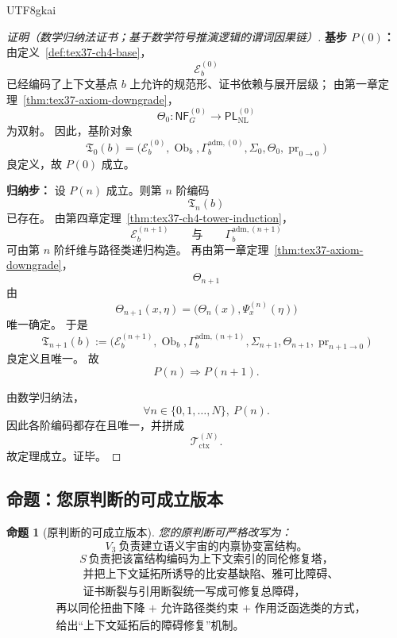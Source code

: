 \documentclass[12pt]{article}
\newtheorem{proposition}{命题}[section]
\begin{document}
\begin{CJK*}{UTF8}{gkai}
\begin{proof}[证明（数学归纳法证书；基于数学符号推演逻辑的谓词因果链）]
\textbf{基步 $P(0)$：}
由定义~\ref{def:tex37-ch4-base}，
\[
  \mathcal E_b^{(0)}
\]
已经编码了上下文基点 $b$ 上允许的规范形、证书依赖与展开层级；
由第一章定理~\ref{thm:tex37-axiom-downgrade}，
\[
  \Theta_0:\mathsf{NF}_G^{(0)}\to \mathsf{PL}_{\mathrm{NL}}^{(0)}
\]
为双射。
因此，基阶对象
\[
  \mathfrak T_0(b)
  =
  \bigl(
    \mathcal E_b^{(0)},
    \operatorname{Ob}_b,
    \Gamma_b^{\mathrm{adm},(0)},
    \Sigma_0,
    \Theta_0,
    \operatorname{pr}_{0\to 0}
  \bigr)
\]
良定义，故 $P(0)$ 成立。

\textbf{归纳步：}
设 $P(n)$ 成立。则第 $n$ 阶编码
\[
  \mathfrak T_n(b)
\]
已存在。
由第四章定理~\ref{thm:tex37-ch4-tower-induction}，
\[
  \mathcal E_b^{(n+1)}
  \qquad\text{与}\qquad
  \Gamma_b^{\mathrm{adm},(n+1)}
\]
可由第 $n$ 阶纤维与路径类递归构造。
再由第一章定理~\ref{thm:tex37-axiom-downgrade}，
\[
  \Theta_{n+1}
\]
由
\[
  \Theta_{n+1}(x,\eta)
  =
  \bigl(
    \Theta_n(x),
    \Psi_x^{(n)}(\eta)
  \bigr)
\]
唯一确定。
于是
\[
  \mathfrak T_{n+1}(b)
  :=
  \bigl(
    \mathcal E_b^{(n+1)},
    \operatorname{Ob}_b,
    \Gamma_b^{\mathrm{adm},(n+1)},
    \Sigma_{n+1},
    \Theta_{n+1},
    \operatorname{pr}_{n+1\to 0}
  \bigr)
\]
良定义且唯一。
故
\[
  P(n)\Rightarrow P(n+1).
\]

由数学归纳法，
\[
  \forall n\in\{0,1,\dots,N\},\ P(n).
\]
因此各阶编码都存在且唯一，并拼成
\[
  \mathcal T_{\mathrm{ctx}}^{(N)}.
\]
故定理成立。证毕。
\end{proof}

\subsection{命题：您原判断的可成立版本}
\label{subsec:tex37-ch20-proposition}

\begin{proposition}[原判断的可成立版本]
\label{prop:tex37-ch20-rewriteable}
您的原判断可严格改写为：
\[
  \boxed{
    V_3\ \text{负责建立语义宇宙的内禀协变富结构。}
  }
\]
\[
  \boxed{
    S\ \text{负责把该富结构编码为上下文索引的同伦修复塔，}
  }
\]
\[
  \boxed{
    \begin{aligned}
      &\text{并把上下文延拓所诱导的比安基缺陷、雅可比障碍、}\\
      &\text{证书断裂与引用断裂统一写成可修复总障碍，}
    \end{aligned}
  }
\]
\[
  \boxed{
    \begin{aligned}
      &\text{再以同伦扭曲下降 + 允许路径类约束 + 作用泛函选类的方式，}\\
      &\text{给出“上下文延拓后的障碍修复”机制。}
    \end{aligned}
  }
\]
\end{proposition}


\end{CJK*}
\end{document}
